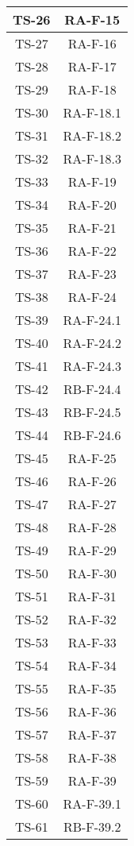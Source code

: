 \begin{center}
\begin{longtable}{|c|c|}
			\hline
			TS-26 & RA-F-15 \\
			\hline
			TS-27 & RA-F-16 \\
			\hline
			TS-28 & RA-F-17 \\
			\hline
			TS-29 & RA-F-18 \\
			\hline
			TS-30 & RA-F-18.1 \\
			\hline
			TS-31 & RA-F-18.2 \\
			\hline
			TS-32 & RA-F-18.3 \\
			\hline
			TS-33 & RA-F-19 \\
			\hline
			TS-34 & RA-F-20 \\
			\hline
			TS-35 & RA-F-21 \\
			\hline
			TS-36 & RA-F-22 \\
			\hline
			TS-37 & RA-F-23 \\
			\hline
			TS-38 & RA-F-24 \\
			\hline
			TS-39 & RA-F-24.1 \\
			\hline
			TS-40 & RA-F-24.2 \\
			\hline
			TS-41 & RA-F-24.3 \\
			\hline
			TS-42 & RB-F-24.4 \\
			\hline
			TS-43 & RB-F-24.5 \\
			\hline
			TS-44 & RB-F-24.6 \\
			\hline
			TS-45 & RA-F-25 \\
			\hline
			TS-46 & RA-F-26 \\
			\hline
			TS-47 & RA-F-27 \\
			\hline
			TS-48 & RA-F-28 \\
			\hline
			TS-49 & RA-F-29 \\
			\hline
			TS-50 & RA-F-30 \\
			\hline
			TS-51 & RA-F-31 \\
			\hline
			TS-52 & RA-F-32 \\
			\hline
			TS-53 & RA-F-33 \\
			\hline
			TS-54 & RA-F-34 \\
			\hline
			TS-55 & RA-F-35 \\
			\hline
			TS-56 & RA-F-36 \\
			\hline
			TS-57 & RA-F-37 \\
			\hline
			TS-58 & RA-F-38 \\
			\hline
			TS-59 & RA-F-39 \\
			\hline
			TS-60 & RA-F-39.1 \\
			\hline
			TS-61 & RB-F-39.2 \\

\end{longtable}
\end{center}
